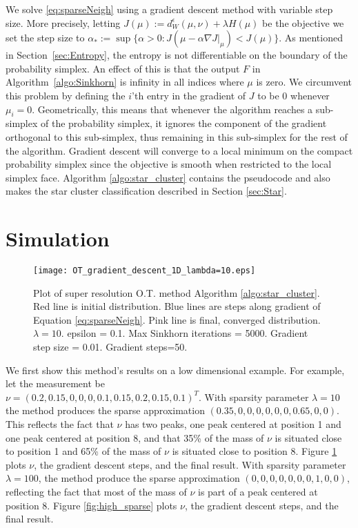 \documentclass[conference]{IEEEtran}
\begin{document}
We solve \eqref{eq:sparseNeigh} using a gradient descent method with variable step size. More precisely, letting $J(\mu) := d_W^\epsilon(\mu,\nu) + \lambda H(\mu)$ be the objective we set the step size to $\alpha_* := \sup\{\alpha>0 : J(\mu-\alpha \nabla J|_\mu) < J(\mu)\}$. 
As mentioned in Section~\ref{sec:Entropy}, the entropy is not differentiable on the boundary of the probability simplex. 
An effect of this is that the output $F$ in Algorithm~\ref{algo:Sinkhorn} is infinity in all indices where $\mu$ is zero. 
We circumvent this problem by defining the $i$'th entry in the gradient of $J$ to be $0$ whenever $\mu_i=0$. Geometrically, this means that whenever the algorithm reaches a sub-simplex of the probability simplex, it ignores the component of the gradient orthogonal to this sub-simplex, thus remaining in this sub-simplex for the rest of the algorithm. 
Gradient descent will converge to a local minimum on the compact probability simplex since the objective is smooth when restricted to the local simplex face. Algorithm \ref{algo:star_cluster} contains the pseudocode and also makes the star cluster classification described in Section \ref{sec:Star}.

\section{Simulation}

\begin{figure}[h]
\centerline{\texttt{[image: OT\_gradient\_descent\_1D\_lambda=10.eps]}}
\caption{Plot of super resolution O.T. method Algorithm \ref{algo:star_cluster}. Red line is initial distribution. Blue lines are steps along gradient of Equation \eqref{eq:sparseNeigh}. Pink line is final, converged distribution. $\lambda=10$.
epsilon = 0.1. Max Sinkhorn iterations = 5000. Gradient step size = 0.01. Gradient steps=50.}
\label{fig:low_sparse}
\end{figure}

We first show this method's results on a low dimensional example. For example, let the measurement be \\
$ \nu = (0.2, 0.15, 0, 0, 0, 0.1, 0.15, 0.2, 0.15, 0.1)^T. $ 
With sparsity parameter $\lambda = 10$  the method produces the sparse approximation $(0.35,0,0,0,0,0,0,0.65,0,0)$.
This reflects the fact that $\nu$ has two peaks, one peak centered at position 1 and one peak centered at position 8, and that 35\% of the mass of $\nu$ is situated close to position 1 and 65\% of the mass of $\nu$ is situated close to position 8. Figure \ref{fig:low_sparse} plots $\nu$, the gradient descent steps, and the final result.
With sparsity parameter $\lambda = 100$, the method produce the sparse approximation $(0,0,0,0,0,0,0,1,0,0)$, reflecting the fact that most of the mass of $\nu$ is part of a peak centered at position 8. Figure \ref{fig:high_sparse} plots $\nu$, the gradient descent steps, and the final result.
\end{document}
